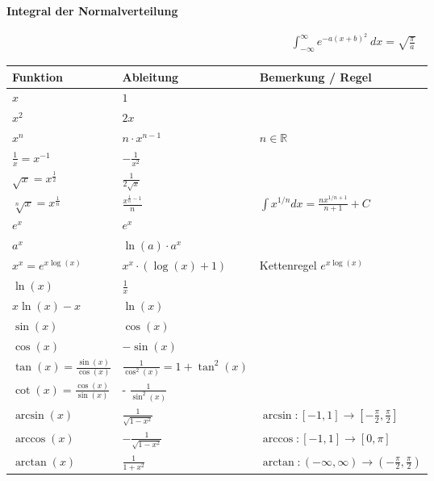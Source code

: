 \documentclass[25pt]{sciposter}
\newcommand{\R}{\mathbb{R}}
\newenvironment{thm}[1]{\begin{mdframed}[backgroundcolor=pink!20,innertopmargin=15pt, innerbottommargin=15pt, nobreak=true]
		\textbf{#1 }
	}
	{ 
	\end{mdframed}
}
\begin{document}
\begin{multicols}{3}
\begin{thm}{Integral der Normalverteilung}
	\begin{align*}
		\int_{-\infty}^{\infty} e^{-a(x+b)^2} \ dx = \sqrt{\frac{\pi}{a}}
	\end{align*}
\end{thm}




\vfill\null
\columnbreak


{\renewcommand{\arraystretch}{1.5}
	\begin{table}[]
		\begin{tabular}{@{} p{} p{} p{} @{}}
			\toprule
			Funktion & Ableitung & Bemerkung / Regel\\ \midrule
			$x$ & $1$ &   \\
			$x^2$& $2x$ &   \\
			$x^n$& $n\cdot x^{n-1}$ & $n \in \R$  \\
			$\frac{1}{x} = x^{-1}$ & $- \frac{1}{x^2}$ & \\
			$\sqrt{x} = x^{\frac{1}{2}}$ & $\frac{1}{2\sqrt{x}}$ & \\ 
			$\sqrt[n]{x} = x^{\frac{1}{n}}$ & $\frac{x^{\frac{1}{n} -1 }}{n}$ &  $\int x^{1/n} dx = \frac{n x^{1/n + 1}}{n+1} + C$\\ 
			$e^x$ & $e^x$ & \\
			$a^x$ & $\ln(a) \cdot a^x$& \\
			$x^x = e^{x\log(x)}$ & $x^x \cdot (\log(x) + 1)$ & Kettenregel $e^{x\log(x)}$\\
			$\ln(x)$ & $\frac{1}{x}$ & \\
			$x\ln(x) - x$ & $\ln(x)$ &  \\ \midrule
			$\sin(x)$ & $\cos(x)$ & \\
			$\cos(x)$ & $- \sin(x)$ & \\ 
			$\tan(x) = \frac{\sin(x)}{\cos(x)}$ & $\frac{1}{\cos^2(x)} = 1 + \tan^2(x)$ &\\
			$\cot(x) = \frac{\cos(x)}{\sin(x)}$ & - $\frac{1}{\sin^2(x)}$ & \\ 
			$\arcsin(x)$ & $\frac{1}{\sqrt{1 - x^2}}$ & $ \arcsin : [-1,1] \to [-\frac{\pi}{2},\frac{\pi}{2}]$\\
			$\arccos(x)$ & $ - \frac{1}{\sqrt{1-x^2}}$ & $\arccos : [-1,1] \to [0, \pi]$\\
			$\arctan(x)$ & $\frac{1}{1+x^2}$ & $\arctan:(-\infty, \infty) \to (- \frac{\pi}{2},\frac{\pi}{2})$\\

\end{tabular}
\end{table}}
\end{multicols}
\end{document}
